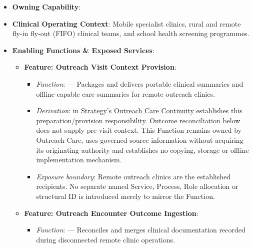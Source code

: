 \begin{itemize}

\item
\textbf{Owning Capability}: \texttt{}



\item
\textbf{Clinical Operating Context}: Mobile specialist clinics, rural and remote fly-in fly-out (FIFO) clinical teams, and school health screening programmes.



\item
\textbf{Enabling Functions \& Exposed Services}:


\begin{itemize}

\item
\textbf{Feature: Outreach Visit Context Provision}:


\begin{itemize}

\item
\emph{Function}: \texttt{} — Packages and delivers portable clinical summaries and offline-capable care summaries for remote outreach clinics.



\item
\emph{Derivation}: \texttt{} in \hyperref[rad:enabling:429]{Strategy's Outreach Care Continuity} establishes this preparation/\allowbreak{}provision responsibility. Outcome reconciliation below does not supply pre-visit context. This Function remains owned by Outreach Care, uses governed source information without acquiring its originating authority and establishes no copying, storage or offline implementation mechanism.



\item
\emph{Exposure boundary}: Remote outreach clinics are the established recipients. No separate named Service, Process, Role allocation or structural ID is introduced merely to mirror the Function.



\end{itemize}


\item
\textbf{Feature: Outreach Encounter Outcome Ingestion}:


\begin{itemize}

\item
\emph{Function}: \texttt{} — Reconciles and merges clinical documentation recorded during disconnected remote clinic operations.




\end{itemize}
\end{itemize}
\end{itemize}
